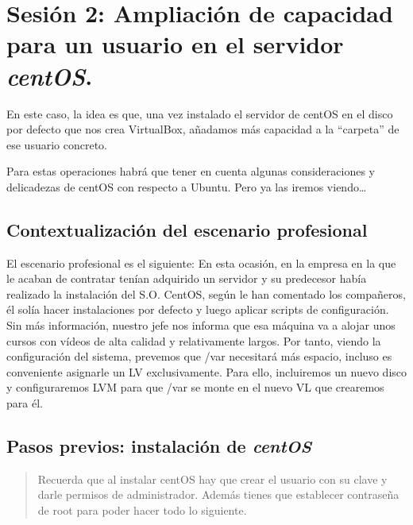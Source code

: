 \documentclass[
]{book}
\begin{document}
\hypertarget{sesiuxf3n-2-ampliaciuxf3n-de-capacidad-para-un-usuario-en-el-servidor-centos.}{%
\section{\texorpdfstring{Sesión 2: Ampliación de capacidad para un usuario en el servidor \textbf{\emph{centOS}}.}{Sesión 2: Ampliación de capacidad para un usuario en el servidor centOS.}}\label{sesiuxf3n-2-ampliaciuxf3n-de-capacidad-para-un-usuario-en-el-servidor-centos.}}

En este caso, la idea es que, una vez instalado el servidor de centOS en el disco por defecto que nos crea VirtualBox, añadamos más capacidad a la ``carpeta'' de ese usuario concreto.

Para estas operaciones habrá que tener en cuenta algunas consideraciones y delicadezas de centOS con respecto a Ubuntu. Pero ya las iremos viendo\ldots{}

\hypertarget{contextualizaciuxf3n-del-escenario-profesional}{%
\subsection{Contextualización del escenario profesional}\label{contextualizaciuxf3n-del-escenario-profesional}}

El escenario profesional es el siguiente: En esta ocasión, en la empresa en la que le acaban de contratar tenían adquirido un servidor y su predecesor había realizado la instalación del S.O. CentOS, según le han comentado los compañeros, él solía hacer instalaciones por defecto y luego aplicar scripts de configuración. Sin más información, nuestro jefe nos informa que esa máquina va a alojar unos cursos con vídeos de alta calidad y relativamente largos. Por tanto, viendo la configuración del sistema, prevemos que /var necesitará más espacio, incluso es conveniente asignarle un LV exclusivamente. Para ello, incluiremos un nuevo disco y configuraremos LVM para que /var se monte en el nuevo VL que crearemos para él.

\hypertarget{pasos-previos-instalaciuxf3n-de-centos}{%
\subsection{\texorpdfstring{Pasos previos: instalación de \textbf{\emph{centOS}}}{Pasos previos: instalación de centOS}}\label{pasos-previos-instalaciuxf3n-de-centos}}

\begin{quote}
Recuerda que al instalar centOS hay que crear el usuario con su clave y darle permisos de administrador. Además tienes que establecer contraseña de root para poder hacer todo lo siguiente.
\end{quote}
\end{document}
